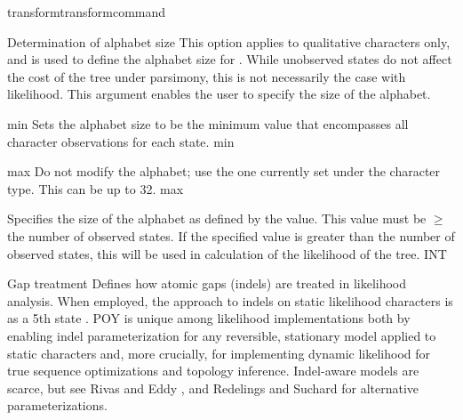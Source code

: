\begin{command}{transform}{transformcommand}
\begin{arguments}
              \begin{argumentgroup}{Determination of alphabet size}
                    This option applies to qualitative characters only, and is used to
                    define the alphabet size for . While unobserved 
                    states do not affect the cost of the tree under parsimony, this is not 
                    necessarily the case with likelihood. 
                    This argument enables the user to specify the size of the alphabet.

                        {\obligatory min}
                            {Sets the alphabet size to be the minimum value that
                            encompasses all character observations for each state.}
                            {min}

                         {\obligatory max}
                            {Do not modify the alphabet; use the one currently
                            set under the character type. This can be up to 32.}%
                            {max}

                         {\obligatory{\poyint}}
                            {Specifies the size of the alphabet as defined by the \poyint value. 
                            This value must be $ \geq $ the number of observed states.
                           If the specified value is greater than the number of observed states, 
                            this \poyint will be used in  calculation of the likelihood of the tree.}
                            {INT}

        \end{argumentgroup}

\begin {argumentgroup} {Gap treatment}
                    Defines how atomic gaps (indels) are treated in
                    likelihood analysis. When employed, the \poy approach to
                    indels on static likelihood characters is as a 5th state 
                    \cite{mcguire2001models,Wheeler2006}. 
                    POY is unique among likelihood implementations both
                    by enabling indel parameterization for any reversible,
                    stationary model applied to static characters and, more
                    crucially, for implementing dynamic likelihood for true
                    sequence optimizations and topology inference. Indel-aware
                    models are scarce, but see Rivas and Eddy \cite{rivas2008probabilistic}, 
                    and Redelings and Suchard \cite{redelings2005joint,redelings2007incorporating}
                    for alternative parameterizations.


\end{argumentgroup}
\end{arguments}
\end{command}
